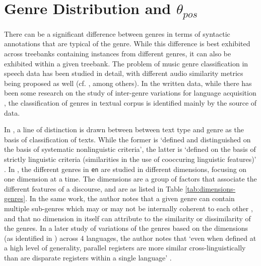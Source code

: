 \section{Genre Distribution and \texorpdfstring{$\theta_{pos}$}{theta\_pos}}
\label{sec:pos-harmony-genre}

There can be a significant difference between genres in terms of syntactic annotations that are typical of the genre. While this difference is best exhibited across treebanks containing instances from different genres, it can also be exhibited within a given treebank. The problem of music genre classification in speech data has been studied in detail, with different audio similarity metrics being proposed as well (cf. \cite{music1, music2}, among others). In the written data, while there has been some research on the study of inter-genre variations for language acquisition \citep{genre-acquisition1}, the classification of genres in textual corpus is identified mainly by the source of data.

In \cite{biber2}, a line of distinction is drawn between between text type and genre as the basis of classification of texts. While the former is `defined and distinguished on the basis of systematic nonlinguistic criteria', the latter is `defined on the basis of strictly linguistic criteria (similarities in the use of cooccuring linguistic features)' \cite[p.~39]{biber2}. In \cite{biber}, the different genres in \verb|en| are studied in different dimensions, focusing on one dimension at a time. The dimensions are a group of factors that associate the different features of a discourse, and are as listed in Table \ref{tab:dimensions-genres}. In the same work, the author notes that a given genre can contain multiple sub-genres which may or may not be internally coherent to each other \cite[p.~170]{biber}, and that no dimension in itself can attribute to the similarity or dissimilarity of the genres. In a later study of variations of the genres based on the dimensions (as identified in \cite{biber}) across 4 languages, the author notes that `even when defined at a high level of generality, parallel registers are more similar cross-linguistically than are disparate registers within a single language' \cite[p.~279]{biberbook}.

